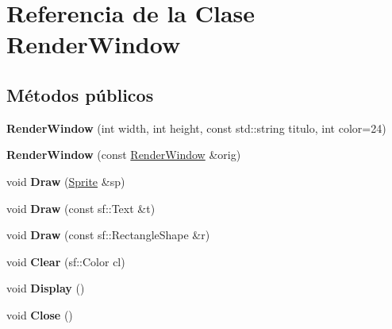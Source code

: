 \hypertarget{classRenderWindow}{\section{Referencia de la Clase Render\-Window}
\label{classRenderWindow}
}
\subsection*{Métodos públicos}
\begin{DoxyCompactItemize}
\item 
\hypertarget{classRenderWindow_a76ea49bd4cfa0de2a6d7198c46f5a6ca}{{\bfseries Render\-Window} (int width, int height, const std\-::string titulo, int color=24)}\label{classRenderWindow_a76ea49bd4cfa0de2a6d7198c46f5a6ca}

\item 
\hypertarget{classRenderWindow_aa668645b5f2dd7d6b076fd7c1932d6c2}{{\bfseries Render\-Window} (const \hyperlink{classRenderWindow}{Render\-Window} \&orig)}\label{classRenderWindow_aa668645b5f2dd7d6b076fd7c1932d6c2}

\item 
\hypertarget{classRenderWindow_afae672189b28d791ff08a5728171edad}{void {\bfseries Draw} (\hyperlink{classSprite}{Sprite} \&sp)}\label{classRenderWindow_afae672189b28d791ff08a5728171edad}

\item 
\hypertarget{classRenderWindow_a9e9630d78d3f4a55df91e2d8e565174e}{void {\bfseries Draw} (const sf\-::\-Text \&t)}\label{classRenderWindow_a9e9630d78d3f4a55df91e2d8e565174e}

\item 
\hypertarget{classRenderWindow_a92325866ed95e94d857324e7245d81ac}{void {\bfseries Draw} (const sf\-::\-Rectangle\-Shape \&r)}\label{classRenderWindow_a92325866ed95e94d857324e7245d81ac}

\item 
\hypertarget{classRenderWindow_a0709228a15fcbabf6723d4d829676eb8}{void {\bfseries Clear} (sf\-::\-Color cl)}\label{classRenderWindow_a0709228a15fcbabf6723d4d829676eb8}

\item 
\hypertarget{classRenderWindow_af81e642b35266ce62c465fac374179ce}{void {\bfseries Display} ()}\label{classRenderWindow_af81e642b35266ce62c465fac374179ce}

\item 
\hypertarget{classRenderWindow_a0e9fd523d9888ca17333e50216ba096c}{void {\bfseries Close} ()}\label{classRenderWindow_a0e9fd523d9888ca17333e50216ba096c}


\end{DoxyCompactItemize}
